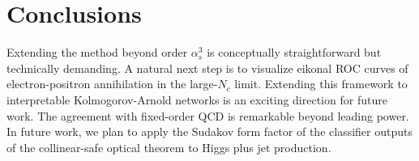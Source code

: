 \section{Conclusions}\label{sec:conclusions}

Extending the method beyond order $\alpha_s^3$ is conceptually
straightforward but technically demanding. A natural next step is to
visualize eikonal ROC curves of electron-positron annihilation in the
large-$N_c$ limit. Extending this framework to interpretable
Kolmogorov-Arnold networks is an exciting direction for future work. The
agreement with fixed-order QCD is remarkable beyond leading power. In
future work, we plan to apply the Sudakov form factor of the classifier
outputs of the collinear-safe optical theorem to Higgs plus jet
production.

